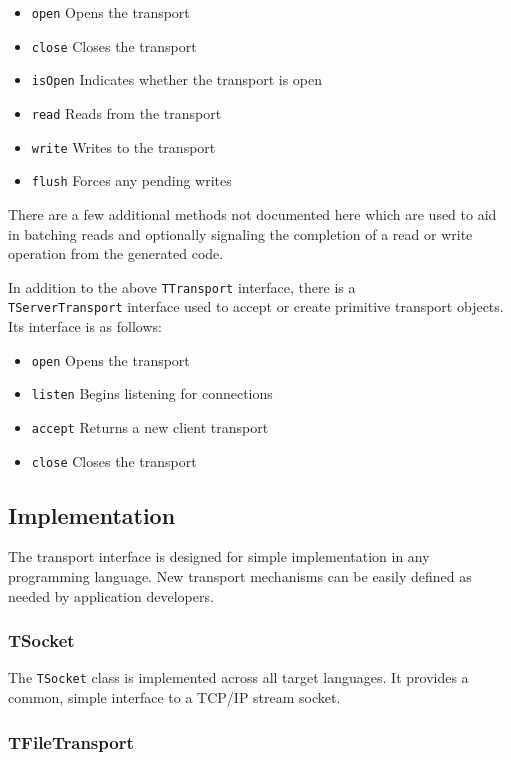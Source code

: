 \documentclass[nocopyrightspace,blockstyle]{sigplanconf}
\begin{document}
\begin{itemize}
\item \texttt{open} Opens the transport
\item \texttt{close} Closes the transport
\item \texttt{isOpen} Indicates whether the transport is open
\item \texttt{read} Reads from the transport
\item \texttt{write} Writes to the transport
\item \texttt{flush} Forces any pending writes
\end{itemize}

There are a few additional methods not documented here which are used to aid
in batching reads and optionally signaling the completion of a read or
write operation from the generated code.

In addition to the above
\texttt{TTransport} interface, there is a\\
\texttt{TServerTransport} interface
used to accept or create primitive transport objects. Its interface is as
follows:

\begin{itemize}
\item \texttt{open} Opens the transport
\item \texttt{listen} Begins listening for connections
\item \texttt{accept} Returns a new client transport
\item \texttt{close} Closes the transport
\end{itemize}

\subsection{Implementation}

The transport interface is designed for simple implementation in any
programming language. New transport mechanisms can be easily defined as needed
by application developers.

\subsubsection{TSocket}

The \texttt{TSocket} class is implemented across all target languages. It
provides a common, simple interface to a TCP/IP stream socket.

\subsubsection{TFileTransport}
\end{document}
